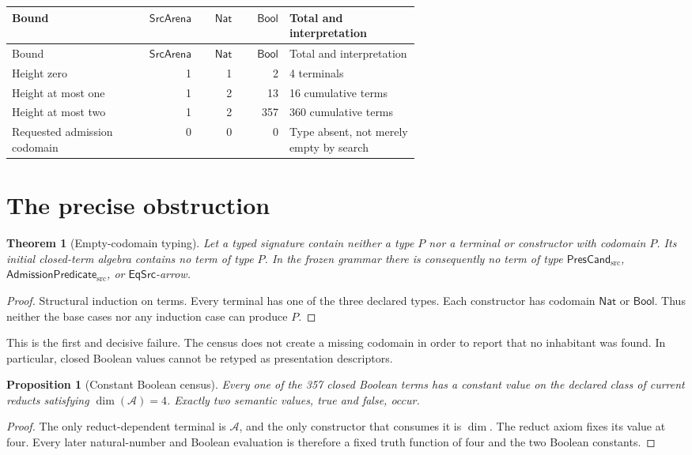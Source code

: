 \documentclass[11pt]{article}
\newtheorem{theorem}{Theorem}
\newtheorem{proposition}{Proposition}
\newcommand{\Src}{\mathsf{SrcArena}}
\newcommand{\Nat}{\mathsf{Nat}}
\newcommand{\Bool}{\mathsf{Bool}}
\newcommand{\Pres}{\mathsf{PresCand}_{\mathrm{src}}}
\newcommand{\Adm}{\mathsf{AdmissionPredicate}_{\mathrm{src}}}
\newcommand{\EqSrc}{\mathsf{EqSrc}}
\begin{document}
\begin{longtable}{P{0.28\linewidth}rrrP{0.32\linewidth}}
\toprule
Bound & \(\Src\) & \(\Nat\) & \(\Bool\) & Total and interpretation \\
\midrule
\endfirsthead
\toprule
Bound & \(\Src\) & \(\Nat\) & \(\Bool\) & Total and interpretation \\
\midrule
\endhead
Height zero & 1 & 1 & 2 & 4 terminals \\
Height at most one & 1 & 2 & 13 & 16 cumulative terms \\
Height at most two & 1 & 2 & 357 & 360 cumulative terms \\
Requested admission codomain & 0 & 0 & 0 & Type absent, not merely empty by search \\
\bottomrule
\end{longtable}

\section{The precise obstruction}

\begin{theorem}[Empty-codomain typing]
Let a typed signature contain neither a type \(P\) nor a terminal or
constructor with codomain \(P\).  Its initial closed-term algebra contains no
term of type \(P\).  In the frozen grammar there is consequently no term of
type \(\Pres\), \(\Adm\), or \(\EqSrc\)-arrow.
\end{theorem}

\begin{proof}
Structural induction on terms.  Every terminal has one of the three declared
types.  Each constructor has codomain \(\Nat\) or \(\Bool\).  Thus neither the
base cases nor any induction case can produce \(P\).
\end{proof}

This is the first and decisive failure.  The census does not create a missing
codomain in order to report that no inhabitant was found.  In particular,
closed Boolean values cannot be retyped as presentation descriptors.

\begin{proposition}[Constant Boolean census]
Every one of the 357 closed Boolean terms has a constant value on the declared
class of current reducts satisfying \(\dim(\mathcal A)=4\).  Exactly two
semantic values, true and false, occur.
\end{proposition}

\begin{proof}
The only reduct-dependent terminal is \(\mathcal A\), and the only constructor
that consumes it is \(\dim\).  The reduct axiom fixes its value at four.
Every later natural-number and Boolean evaluation is therefore a fixed truth
function of four and the two Boolean constants.
\end{proof}
\end{document}
